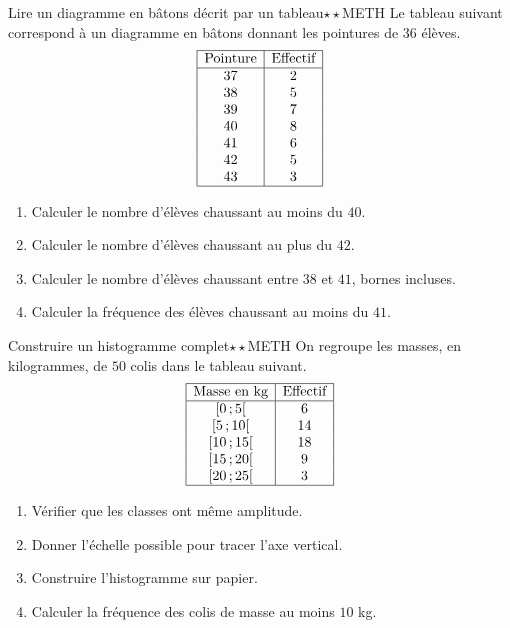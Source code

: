\documentclass[11pt,a4paper]{article}
\newcommand{\classe}[2]{\ensuremath{[#1\,;#2[}}
\newcounter{exo}
\newcounter{corr}
\begin{document}
\begin{exobox}{Lire un diagramme en bâtons décrit par un tableau}{$\star\star$}{METH}
Le tableau suivant correspond à un diagramme en bâtons donnant les pointures de $36$ élèves.
\[
\begin{array}{|c|c|}
\hline
\text{Pointure} & \text{Effectif} \\
\hline
37 & 2 \\
38 & 5 \\
39 & 7 \\
40 & 8 \\
41 & 6 \\
42 & 5 \\
43 & 3 \\
\hline
\end{array}
\]
\begin{enumerate}
\item Calculer le nombre d'élèves chaussant au moins du $40$.
\item Calculer le nombre d'élèves chaussant au plus du $42$.
\item Calculer le nombre d'élèves chaussant entre $38$ et $41$, bornes incluses.
\item Calculer la fréquence des élèves chaussant au moins du $41$.
\end{enumerate}
\end{exobox}

\begin{exobox}{Construire un histogramme complet}{$\star\star$}{METH}
On regroupe les masses, en kilogrammes, de $50$ colis dans le tableau suivant.
\[
\begin{array}{|c|c|}
\hline
\text{Masse en kg} & \text{Effectif} \\
\hline
\classe{0}{5} & 6 \\
\classe{5}{10} & 14 \\
\classe{10}{15} & 18 \\
\classe{15}{20} & 9 \\
\classe{20}{25} & 3 \\
\hline
\end{array}
\]
\begin{enumerate}
\item Vérifier que les classes ont même amplitude.
\item Donner l'échelle possible pour tracer l'axe vertical.
\item Construire l'histogramme sur papier.
\item Calculer la fréquence des colis de masse au moins $10$ kg.
\end{enumerate}
\end{exobox}
\end{document}
